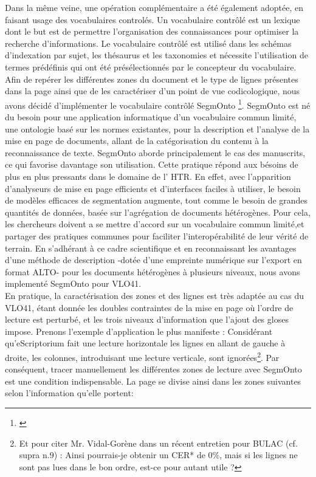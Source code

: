 \documentclass[a4paper, twoside, 12pt]{book}
\begin{document}
Dans la même veine, une opération complémentaire a été également adoptée, en faisant usage des vocabulaires controlés.
Un vocabulaire contrôlé est un lexique dont le but est de permettre l'organisation des connaissances pour optimiser la recherche d'informations. Le vocabulaire contrôlé est utilisé dans les schémas d'indexation par sujet, les thésaurus et les taxonomies et nécessite l'utilisation de termes prédéfinis qui ont été présélectionnés par le concepteur du vocabulaire.  Afin de repérer les différentes zones du document et le type de lignes présentes dans la page ainsi que de les caractériser d'un point de vue codicologique, nous avons décidé d'implémenter le vocabulaire contrôlé SegmOnto \footnote{\cite{gabay2021segmonto}}. SegmOnto est né du besoin pour une application informatique d'un vocabulaire commun limité, une ontologie basé sur les normes existantes, pour la description et l'analyse de la mise en page de documents, allant de la catégorisation du contenu à la reconnaissance de texte. SegmOnto aborde principalement le cas des manuscrits, ce qui favorise davantage son utilisation. Cette pratique répond aux bésoins de plus en plus pressants dans le domaine de l' HTR. En effet, avec l'apparition d'analyseurs de mise en page eﬀicients et d'interfaces faciles à utiliser, le besoin de modèles efficaces de segmentation augmente, tout comme le besoin de grandes quantités de données, basée sur l'agrégation de documents hétérogènes. Pour cela, les chercheurs doivent a se mettre d'accord sur un vocabulaire commun limité,et partager des pratiques communes pour faciliter l'interopérabilité de leur vérité de terrain. En s'adhérant à ce cadre scientifique et en reconnaissant les avantages d'une méthode de description -dotée d'une empreinte numérique sur l'export en format ALTO- pour les documents hétérogènes à plusieurs niveaux, nous avons implementé SegmOnto pour VLO41.\\

En pratique, la caractérisation des zones et des lignes est très adaptée au cas du VLO41, étant donnée les doubles contraintes de la mise en page où l'ordre de lecture est perturbé, et les trois niveaux d'information que l'ajout des gloses impose. Prenons l'exemple d'application le plus manifeste : Considérant qu'eScriptorium fait une lecture horizontale les lignes en allant de gauche à droite, les colonnes, introduisant une lecture verticale, sont ignorées\footnote{Et pour citer Mr. Vidal-Gorène dans un récent entretien pour BULAC (cf. supra n.9) : \og{} Ainsi pourrais-je obtenir un CER* de 0\%, mais si les lignes ne sont pas lues dans le bon
ordre, est-ce pour autant utile ?\fg{} }. Par conséquent, tracer manuellement les différentes \og{} zones de lecture \fg{} avec SegmOnto est une condition indispensable. La page se divise ainsi dans les zones suivantes selon l'information qu'elle portent:
\end{document}
